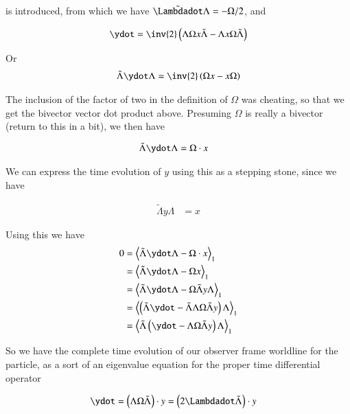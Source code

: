 \documentclass{article}
\newcommand{\reverse}[1]{\tilde{{#1}}}
\begin{document}
is introduced, from which we have $\reverse{\Lambdadot} \Lambda = -\Omega/2$, and

\begin{align*}
\ydot &= \inv{2} \left( \Lambda \Omega x \reverse{\Lambda} - \Lambda x \Omega \reverse{\Lambda} \right) \\
\end{align*}

Or
\begin{align*}
\reverse{\Lambda} \ydot \Lambda &= \inv{2} \left( \Omega x - x \Omega \right) \\
\end{align*}

The inclusion of the factor of two in the definition of $\Omega$ was cheating, so that we get the bivector vector dot product above.  Presuming $\Omega$ is really a bivector (return to this in a bit), we then have

\begin{align}
\reverse{\Lambda} \ydot \Lambda &= \Omega \cdot x 
\end{align}

We can express the time evolution of $y$ using this as a stepping stone, since we have

\begin{align*}
\reverse{\Lambda} y \Lambda &= x 
\end{align*}

Using this we have
\begin{align*}
0 
&= \gpgradeone{ \reverse{\Lambda} \ydot \Lambda - \Omega \cdot x } \\
&= \gpgradeone{ \reverse{\Lambda} \ydot \Lambda - \Omega x } \\
&= \gpgradeone{ \reverse{\Lambda} \ydot \Lambda - \Omega \reverse{\Lambda} y \Lambda } \\
&= \gpgradeone{ \left( \reverse{\Lambda} \ydot - \reverse{\Lambda} \Lambda \Omega \reverse{\Lambda} y \right) \Lambda } \\
&= \gpgradeone{ \reverse{\Lambda} \left( \ydot - \Lambda \Omega \reverse{\Lambda} y \right) \Lambda } \\
\end{align*}

So we have the complete time evolution of our observer frame worldline for the particle, as a sort of an eigenvalue 
equation for the proper time differential operator

\begin{align*}
\ydot 
&= \left( \Lambda \Omega \reverse{\Lambda} \right) \cdot y = \left( 2 \Lambdadot \reverse{\Lambda} \right) \cdot y 
\end{align*}
\end{document}
